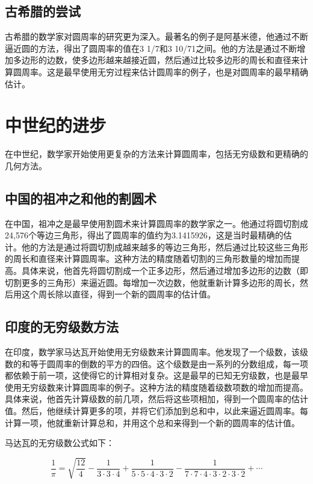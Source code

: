 \documentclass{ctexart}
\begin{document}
\subsection{古希腊的尝试}

古希腊的数学家对圆周率的研究更为深入。最著名的例子是阿基米德，他通过不断逼近圆的方法，得出了圆周率的值在3 1/7和3 10/71之间。他的方法是通过不断增加多边形的边数，使多边形越来越接近圆，然后通过比较多边形的周长和直径来计算圆周率。这是最早使用无穷过程来估计圆周率的例子，也是对圆周率的最早精确估计\cite{archimedespi}。

\section{中世纪的进步}

在中世纪，数学家开始使用更复杂的方法来计算圆周率，包括无穷级数和更精确的几何方法。

\subsection{中国的祖冲之和他的割圆术}

在中国，祖冲之是最早使用割圆术来计算圆周率的数学家之一。他通过将圆切割成24,576个等边三角形，得出了圆周率的值约为3.1415926，这是当时最精确的估计。他的方法是通过将圆切割成越来越多的等边三角形，然后通过比较这些三角形的周长和直径来计算圆周率。这种方法的精度随着切割的三角形数量的增加而提高。具体来说，他首先将圆切割成一个正多边形，然后通过增加多边形的边数（即切割更多的三角形）来逼近圆。每增加一次边数，他就重新计算多边形的周长，然后用这个周长除以直径，得到一个新的圆周率的估计值\cite{zuchongzhi}。

\subsection{印度的无穷级数方法}

在印度，数学家马达瓦开始使用无穷级数来计算圆周率。他发现了一个级数，该级数的和等于圆周率的倒数的平方的四倍。这个级数是由一系列的分数组成，每一项都依赖于前一项，这使得它的计算相对复杂。这是最早的已知无穷级数，也是最早使用无穷级数来计算圆周率的例子。这种方法的精度随着级数项数的增加而提高。具体来说，他首先计算级数的前几项，然后将这些项相加，得到一个圆周率的估计值。然后，他继续计算更多的项，并将它们添加到总和中，以此来逼近圆周率。每计算一项，他就重新计算总和，并用这个总和来得到一个新的圆周率的估计值\cite{madhava}。

马达瓦的无穷级数公式如下：

\[
    \frac{1}{\pi} = \sqrt{\frac{12}{4}} - \frac{1}{3\cdot3\cdot4} + \frac{1}{5\cdot5\cdot4\cdot3\cdot2} - \frac{1}{7\cdot7\cdot4\cdot3\cdot2\cdot3\cdot2} + \cdots
\]
\end{document}
